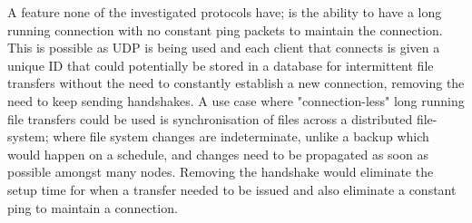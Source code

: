 A feature none of the investigated protocols have; is the ability to have a long running connection with no constant ping packets to maintain the connection. This is possible as UDP is being used and each client that connects is given a unique ID that could potentially be stored in a database for intermittent file transfers without the need to constantly establish a new connection, removing the need to keep sending handshakes. A use case where "connection-less" long running file transfers could be used is synchronisation of files across a distributed file-system; where file system changes are indeterminate, unlike a backup which would happen on a schedule, and changes need to be propagated as soon as possible amongst many nodes. Removing the handshake would eliminate the setup time for when a transfer needed to be issued and also eliminate a constant ping to maintain a connection.
